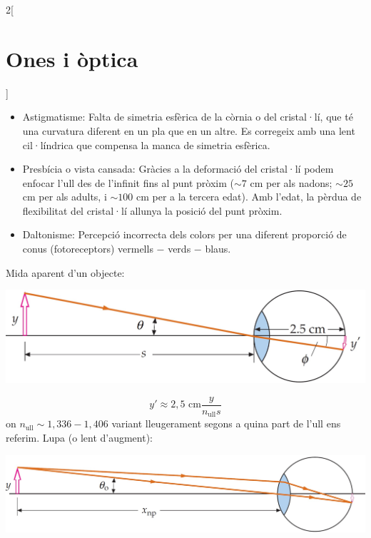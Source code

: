\documentclass[../../../main.tex]{subfiles}
\begin{document}
\begin{multicols}{2}[\section{Ones i òptica}]
\begin{itemize}
\begin{minipage}{\linewidth}
    \end{minipage}
    \item Astigmatisme: Falta de simetria es\-fè\-ri\-ca de la còrnia o del cristal·lí, que té una curvatura diferent en un pla que en un altre. Es corregeix amb una lent cil·líndrica que compensa la manca de simetria esfèrica.
    \item Presbícia o vista cansada: Gràcies a la deformació del cristal·lí podem enfocar l'ull des de l'infinit fins al punt pròxim ($\sim7$ cm per als nadons; $\sim25$ cm per als adults, i $\sim100$ cm per a la tercera edat). Amb l'edat, la pèrdua de fle\-xi\-bi\-li\-tat del cristal·lí allunya la posició del punt pròxim.
    \item Daltonisme: Percepció incorrecta dels co\-lors per una diferent proporció de conus (fotoreceptors) vermells $-$ verds $-$ blaus.
\end{itemize}
Mida aparent d'un objecte:\newline
\begin{minipage}{\linewidth}
    \centering
    \includegraphics[width=\linewidth]{Physics/1st/Waves_and_optics/Images/mida.jpg} 
\end{minipage} $$y'\approx2,5\text{ cm}\frac{y}{n_{\text{ull}}s}$$ {\footnotesize on $n_{\text{ull}}\sim1,336-1,406$ variant lleugerament segons a quina part de l'ull ens referim.}\newline
Lupa (o lent d'augment):\newline
\begin{minipage}{\linewidth}
    \includegraphics[width=\linewidth]{Physics/1st/Waves_and_optics/Images/senselup.jpg} 

\end{minipage}
\end{multicols}
\end{document}
